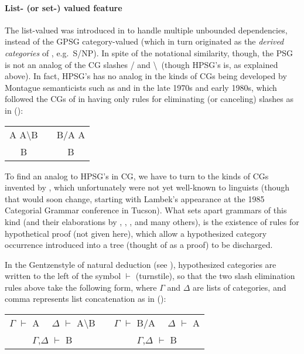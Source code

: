 \documentclass[output=paper,biblatex,babelshorthands,newtxmath,draftmode,colorlinks,citecolor=brown]{langscibook}
\begin{document}
\paragraph*{List- (or set-) valued \slasch feature} The list-valued \slasch was introduced in \citet{Pollard85a-u} to handle multiple unbounded dependencies, instead of the GPSG category-valued \slasch (which in turn originated as the \emph{derived categories} of  \citet{Gazdar81a}, e.g.~S/NP). In spite of the notational similarity, though, the PSG \slasch is not an analog of the CG slashes / and \textbackslash \ (though HPSG's \subcat is, as explained above). In fact, HPSG's \slasch has no analog in the kinds of CGs being developed by Montague semanticists such as \citet{Bach79a,Bach80a} and \citet{Dowty82a-u} in the late 1970s and early 1980s, which followed the CGs of \citet{Bar-Hillel54-u} in having only rules for eliminating (or canceling) slashes as in ():

\ea
\begin{tabular}[t]{ccc}
A A{\textbackslash}B  & &     B/A A \\ \cline{1-1} \cline{3-3}
B & & B 
\end{tabular}
\z

\noindent
To find an analog to HPSG's \slasch in CG, we have to turn to the kinds of CGs invented by \citet{Lambek1958}, which unfortunately were not yet well-known to linguists (though that would soon change, starting with Lambek's appearance at the 1985 Categorial Grammar conference in Tucson). What sets apart grammars 
of this kind (and their elaborations by \citet{Moortgat89a-u}, \citet{OBW88a-ed}, \citet{Morrill94a-u}, and many others), is the existence of rules for hypothetical proof (not given here), which allow a hypothesized category occurrence introduced into a tree (thought of as a proof) to be discharged. 

In the Gentzen\addref style of natural deduction (see \citealt{Pollard:2013}), hypothesized categories are written to the left of the symbol $\vdash$ (turnstile), so that the two slash elimination rules above take the following form, where $\Gamma$ and $\Delta$ are lists of categories, and comma represents list concatenation as in ():

\ea
\begin{tabular}[t]{ccc}
$\Gamma$ $\vdash$ A \ \ $\Delta$ $\vdash$ A{\textbackslash}B  & &     $\Gamma$ $\vdash$ B/A \ \ $\Delta$ $\vdash$ A \\ \cline{1-1} \cline{3-3}
$\Gamma$,$\Delta$ $\vdash$ B & & $\Gamma$,$\Delta$ $\vdash$ B 
\end{tabular}
\z
\end{document}
